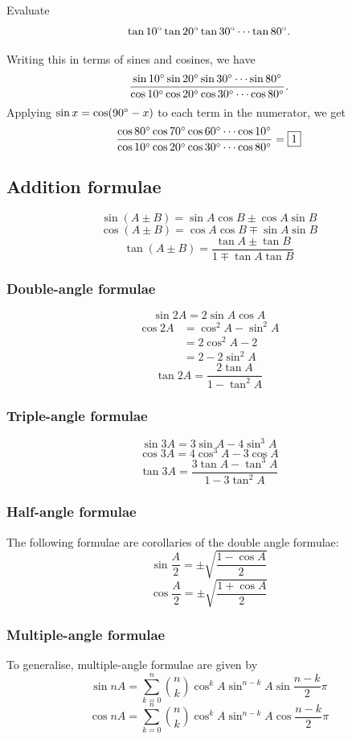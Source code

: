 \begin{exercise}
Evaluate
\[ \tan10\degree\tan20\degree\tan30\degree\cdots\tan80\degree. \]
\end{exercise}
\begin{solution}
Writing this in terms of sines and cosines, we have
\[ \frac{\sin10\degree\sin20\degree\sin30\degree\cdots\sin80\degree}{\cos10\degree\cos20\degree\cos30\degree\cdots\cos80\degree}. \]
Applying $\sin x=\cos(90\degree-x)$ to each term in the numerator, we get
\[ \frac{\cos80\degree\cos70\degree\cos60\degree\cdots\cos10\degree}{\cos10\degree\cos20\degree\cos30\degree\cdots\cos80\degree}=\boxed{1} \]
\end{solution}

\subsection{Addition formulae}
\[ \sin (A \pm B) = \sin A \cos B \pm \cos A \sin B \]
\[ \cos (A \pm B) = \cos A \cos B \mp \sin A \sin B \]
\[ \tan (A \pm B) = \frac{\tan A \pm \tan B}{1 \mp \tan A \tan B} \]

\subsubsection{Double-angle formulae}
\[ \sin 2A = 2 \sin A \cos A \]
\[ \begin{split}
\cos 2A &= \cos^2 A-\sin^2 A \\
&= 2 \cos^2 A-2 \\
&= 2-2 \sin^2 A
\end{split} \]
\[ \tan 2A = \frac{2 \tan A}{1-\tan^2 A} \]

\subsubsection{Triple-angle formulae}
\[ \sin 3A = 3 \sin A-4 \sin^3 A \]
\[ \cos 3A = 4 \cos^3 A- 3 \cos A \]
\[ \tan 3A = \frac{3\tan A-\tan^3A}{1-3\tan^2A} \]

\subsubsection{Half-angle formulae}
The following formulae are corollaries of the double angle formulae:
\[ \sin \frac{A}{2} = \pm \sqrt{\frac{1-\cos A}{2}} \]
\[ \cos \frac{A}{2} = \pm \sqrt{\frac{1+\cos A}{2}} \]

\subsubsection{Multiple-angle formulae}
To generalise, multiple-angle formulae are given by
\[ \sin nA = \sum_{k=0}^n \binom{n}{k} \cos^kA \sin^{n-k}A \sin\frac{n-k}{2}\pi \]
\[ \cos nA = \sum_{k=0}^n \binom{n}{k} \cos^kA \sin^{n-k}A \cos\frac{n-k}{2}\pi \]

